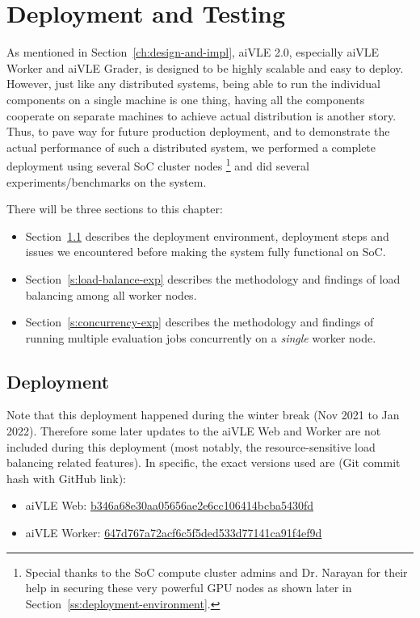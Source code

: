 \documentclass[fyp]{socreport}
\begin{document}
\chapter{Deployment and Testing}
\label{ch:deployment-and-testing}
As mentioned in Section~\ref{ch:design-and-impl}, aiVLE 2.0, especially aiVLE Worker and aiVLE Grader, is designed to be highly scalable and easy to deploy. However, just like any distributed systems, being able to run the individual components on a single machine is one thing, having all the components cooperate on separate machines to achieve actual distribution is another story. Thus, to pave way for future production deployment, and to demonstrate the actual performance of such a distributed system, we performed a complete deployment using several SoC cluster nodes \footnote{Special thanks to the SoC compute cluster admins and Dr. Narayan for their help in securing these very powerful GPU nodes as shown later in Section~\ref{ss:deployment-environment}.} and did several experiments/benchmarks on the system.

There will be three sections to this chapter: 

\begin{itemize}
    \item Section~\ref{s:deployment} describes the deployment environment, deployment steps and issues we encountered before making the system fully functional on SoC.
    \item Section~\ref{s:load-balance-exp} describes the methodology and findings of load balancing among all worker nodes.
    \item Section~\ref{s:concurrency-exp} describes the methodology and findings of running multiple evaluation jobs concurrently on a \emph{single} worker node.
\end{itemize}

\section{Deployment}
\label{s:deployment}
Note that this deployment happened during the winter break (Nov 2021 to Jan 2022). Therefore some later updates to the aiVLE Web and Worker are not included during this deployment (most notably, the resource-sensitive load balancing related features). In specific, the exact versions used are (Git commit hash with GitHub link):
\begin{itemize}
    \item aiVLE Web: \href{https://github.com/edu-ai/aivle-web/commit/b346a68e30aa05656ae2e6cc106414bcba5430fd}{b346a68e30aa05656ae2e6cc106414bcba5430fd}
    \item aiVLE Worker: \href{https://github.com/edu-ai/aivle-worker/commit/647d767a72acf6c5f5ded533d77141ca91f4ef9d}{647d767a72acf6c5f5ded533d77141ca91f4ef9d}
\end{itemize}
\end{document}
